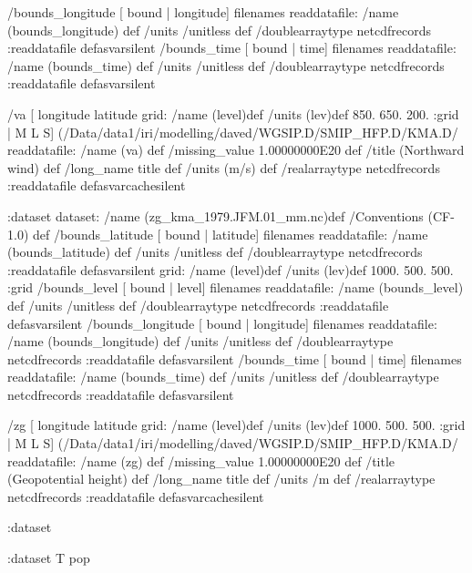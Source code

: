  /bounds_longitude{
[ bound | longitude] filenames readdatafile:
/name (bounds_longitude) def
 /units /unitless def
 /doublearraytype netcdfrecords :readdatafile
}defasvarsilent
 /bounds_time{
[ bound | time] filenames readdatafile:
/name (bounds_time) def
 /units /unitless def
 /doublearraytype netcdfrecords :readdatafile
}defasvarsilent
\begin{ingrid}
 /va{
[ longitude latitude grid:
/name (level)def
/units (lev)def
 850. 650. 200.
:grid
| M L S]
(/Data/data1/iri/modelling/daved/WGSIP.D/SMIP_HFP.D/KMA.D/%
readdatafile:
/name (va) def
 /missing_value 1.00000000E20 def
 /title (Northward wind) def
 /long_name title def /units (m/s) def
 /realarraytype netcdfrecords :readdatafile
}defasvarcachesilent
\end{ingrid}
:dataset
dataset:
/name (zg_kma_1979.JFM.01_mm.nc)def
 /Conventions (CF-1.0) def
 /bounds_latitude{
[ bound | latitude] filenames readdatafile:
/name (bounds_latitude) def
 /units /unitless def
 /doublearraytype netcdfrecords :readdatafile
}defasvarsilent
grid:
/name (level)def
/units (lev)def
 1000. 500. 500.
:grid
 /bounds_level{
[ bound | level] filenames readdatafile:
/name (bounds_level) def
 /units /unitless def
 /doublearraytype netcdfrecords :readdatafile
}defasvarsilent
 /bounds_longitude{
[ bound | longitude] filenames readdatafile:
/name (bounds_longitude) def
 /units /unitless def
 /doublearraytype netcdfrecords :readdatafile
}defasvarsilent
 /bounds_time{
[ bound | time] filenames readdatafile:
/name (bounds_time) def
 /units /unitless def
 /doublearraytype netcdfrecords :readdatafile
}defasvarsilent
\begin{ingrid}
 /zg{
[ longitude latitude grid:
/name (level)def
/units (lev)def
 1000. 500. 500.
:grid
| M L S]
(/Data/data1/iri/modelling/daved/WGSIP.D/SMIP_HFP.D/KMA.D/%
readdatafile:
/name (zg) def
 /missing_value 1.00000000E20 def
 /title (Geopotential height) def
 /long_name title def /units /m def
 /realarraytype netcdfrecords :readdatafile
}defasvarcachesilent
\end{ingrid}
:dataset
\begin{ingrid}
:dataset
T pop
\end{ingrid}


